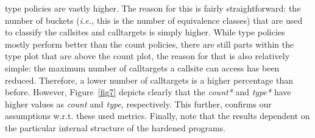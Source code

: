 type policies are vastly higher. The reason for this is fairly straightforward: the number 
of buckets (\textit{i.e.,} this is the number of equivalence classes)
that are used to classify the callsites and calltargets is simply higher. While type policies mostly 
perform better than the count policies, there are still parts within the type plot that are above the 
count plot, the reason for that is also relatively simple: the maximum number of calltargets a 
callsite can access has been reduced. Therefore, a lower number of calltargets is a higher 
percentage than before. However, Figure~\ref{fig7} depicts clearly
that the \textit{count*} and \textit{type*} have higher values as 
\textit{count} and \textit{type}, respectively. This further, confirms our assumptions 
w.r.t. these used metrics. Finally, note that the results dependent on the particular 
internal structure of the hardened programs.


